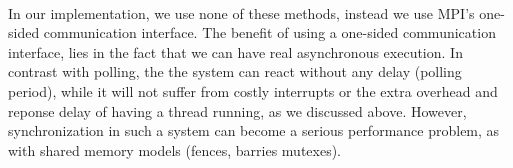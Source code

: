 \paragraph{}
In our implementation, we use none of these methods, instead we use MPI's one-sided communication interface.  The benefit
of using a one-sided communication interface, lies in the fact that we can have real asynchronous execution.  In contrast 
with polling, the the system can react without any delay (polling period), while it will not suffer from costly interrupts
or the extra overhead and reponse delay of having a thread running, as we discussed above.  However, synchronization in such
a system can become a serious performance problem, as with shared memory models (fences, barries mutexes).





